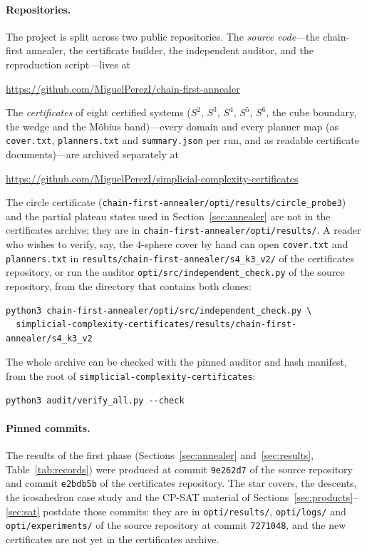 \documentclass[12pt]{article}
\begin{document}
\paragraph{Repositories.}  The project is split across two public repositories.
The \emph{source code}---the chain-first annealer, the certificate builder,
the independent auditor, and the reproduction script---lives at
\begin{center}
\url{https://github.com/MiguelPerezI/chain-first-annealer}
\end{center}
The \emph{certificates} of eight certified systems ($S^2$, $S^3$, $S^4$,
$S^5$, $S^6$, the cube boundary, the wedge and the M\"obius band)---every domain and every planner
map (as \texttt{cover.txt}, \texttt{planners.txt}
and \texttt{summary.json} per run, and as readable certificate documents)---are
archived separately at
\begin{center}
\url{https://github.com/MiguelPerezI/simplicial-complexity-certificates}
\end{center}
The circle certificate
(\texttt{chain-first-annealer/opti/results/circle\_probe3}) and the
partial plateau states used in Section~\ref{sec:annealer} are not in the
certificates archive; they are in \texttt{chain-first-annealer/opti/results/}.
A reader who wishes to verify, say, the $4$-sphere cover by hand can
open \texttt{cover.txt} and \texttt{planners.txt} in
\texttt{results/chain-first-annealer/s4\_k3\_v2/} of the certificates
repository, or run the auditor \texttt{opti/src/independent\_check.py}
of the source repository, from the directory that contains both clones:
{\footnotesize
\begin{verbatim}
python3 chain-first-annealer/opti/src/independent_check.py \
  simplicial-complexity-certificates/results/chain-first-annealer/s4_k3_v2
\end{verbatim}}
\noindent The whole archive can be checked with the pinned auditor and
hash manifest, from the root of \texttt{simplicial-complexity-certificates}:
{\footnotesize
\begin{verbatim}
python3 audit/verify_all.py --check
\end{verbatim}}

\paragraph{Pinned commits.}  The results of the first phase (Sections~\ref{sec:annealer}
and~\ref{sec:results}, Table~\ref{tab:records}) were produced at
commit \texttt{9e262d7} of the source repository and commit
\texttt{e2bdb5b} of the certificates repository.  The star covers, the
descents, the icosahedron case study and the CP-SAT material of
Sections~\ref{sec:products}--\ref{sec:sat} postdate those commits: they
are in \texttt{opti/results/}, \texttt{opti/logs/} and
\texttt{opti/experiments/} of the source repository at commit
\texttt{7271048}, and the new certificates are not yet in the certificates
archive.
\end{document}
